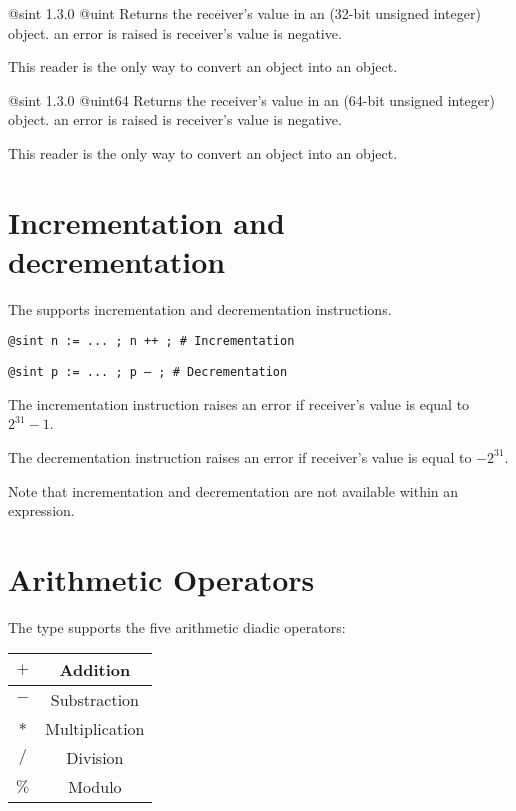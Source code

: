 {@sint}
{1.3.0}
{@uint}
{Returns the receiver's value in an  (32-bit unsigned integer) object.}
{an error is raised is receiver's value is negative.}

This reader is the only way to convert an  object into an  object.




{@sint}
{1.3.0}
{@uint64}
{Returns the receiver's value in an  (64-bit unsigned integer) object.}
{an error is raised is receiver's value is negative.}

This reader is the only way to convert an  object into an  object.





\section{Incrementation and decrementation}

The  supports incrementation and decrementation instructions.

\texttt{@sint n := ... ; n ++ ; \# Incrementation}

\texttt{@sint p := ... ; p -- ; \# Decrementation}\newline

The incrementation instruction raises an error if receiver's value is equal to $2^{31}-1$.\newline

The decrementation instruction raises an error if receiver's value is equal to $-2^{31}$.\newline

Note that incrementation and decrementation are not available within an expression.




\section{Arithmetic Operators}

The  type supports the five arithmetic diadic operators:\newline

\begin{tabular}{|c|c|}
\hline
$+$ & Addition \\
\hline
$-$ & Substraction \\
\hline
$*$ & Multiplication \\
\hline
$/$ & Division \\
\hline
$\%$ & Modulo \\
\hline
\end{tabular}

